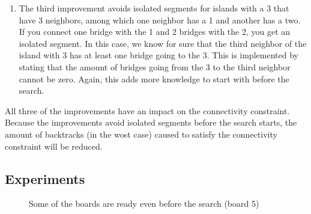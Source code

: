 \documentclass{report}
\begin{document}
\begin{enumerate}
	\item The third improvement avoids isolated segments for islands with a 3 that have 3 neighbors, among which one neighbor has a 1 and another has a two. If you connect one bridge with the 1 and 2 bridges with the 2, you get an isolated segment. In this case, we know for sure that the third neighbor of the island with 3 has at least one bridge going to the 3. This is implemented by stating that the amount of bridges going from the 3 to the third neighbor cannot be zero. Again, this adds more knowledge to start with before the search.
\end{enumerate}

All three of the improvements have an impact on the connectivity constraint. Because the improvements avoid isolated segments before the search starts, the amount of backtracks (in the wost case) caused to satisfy the connectivity constraint will be reduced.

\subsection{Experiments}

	\begin{figure}[h]
        \centering
        \qquad
        \caption{Some of the boards are ready even before the search (board 5)}%
    \end{figure}
    
\end{document}
